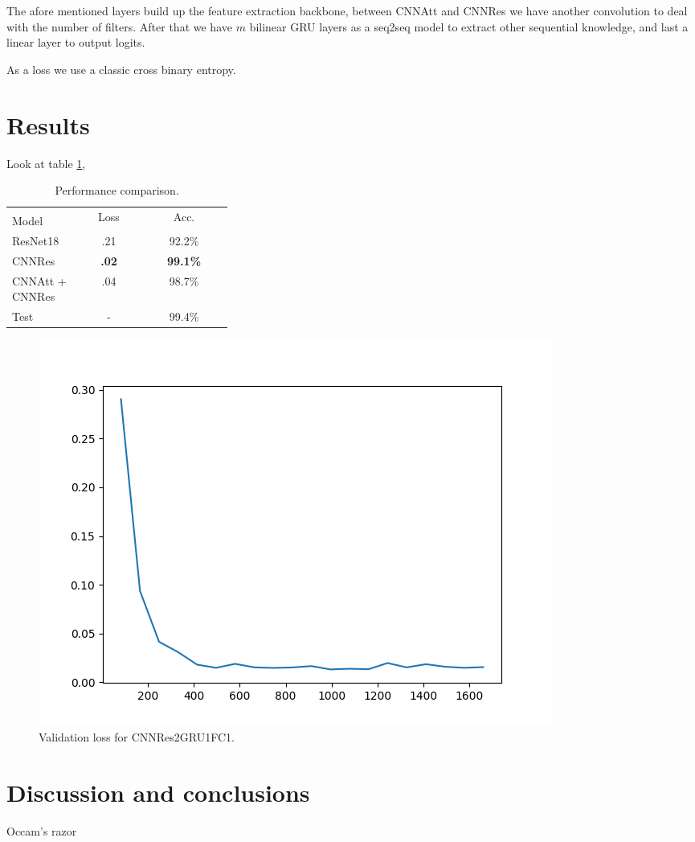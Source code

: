 \documentclass{article}
\begin{document}
The afore mentioned layers build up the feature extraction backbone, between CNNAtt and CNNRes we have another convolution to deal with the number of filters.
After that we have $m$ bilinear GRU layers as a seq2seq model to extract other sequential knowledge, and last a linear layer to output logits.

As a loss we use a classic cross binary entropy.

\section{Results}
Look at table \ref{tab:joint-results}, 

\begin{table}[h!]
    \caption{Performance comparison.}
    \label{tab:joint-results}
    \begin{center}
        \begin{small}
            \begin{tabular}{p{0.32\linewidth} | cc}
                \toprule
                & \multirow{2}{0.1\linewidth}{Loss} 
                & \multirow{2}{0.1\linewidth}{Acc.} \\
                Model \\
                \midrule
                ResNet18 & .21 & 92.2\% \\
                CNNRes & \textbf{.02} & \textbf{99.1\%} \\
                CNNAtt + CNNRes & .04 & 98.7\% \\
                \midrule
                \midrule
                Test & - & 99.4\% \\
                \bottomrule
            \end{tabular}
        \end{small}
    \end{center}
    \vspace{-0.5cm}
\end{table}

\begin{figure}
    \centering
    \includegraphics[scale=.5]{images/val_loss.png}
    \caption{Validation loss for CNNRes2GRU1FC1.}
    \label{fig:val-loss}
\end{figure}





\section{Discussion and conclusions}
Occam's razor



\end{document}
